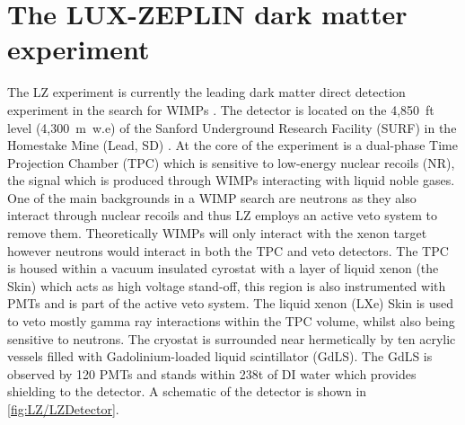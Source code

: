 \chapter{The LUX-ZEPLIN dark matter experiment}\label{chap:LZExperiment}
The LZ experiment is currently the leading dark matter direct detection experiment in the search for WIMPs \cite{LZ:2024zvo}. The detector is located on the 4,850~ft level (4,300~m~w.e) of the Sanford Underground Research Facility (SURF) in the Homestake Mine (Lead, SD) \cite{LZNIMA}. At the core of the experiment is a dual-phase Time Projection Chamber (TPC) which is sensitive to low-energy nuclear recoils (NR), the signal which is produced through WIMPs interacting with liquid noble gases. One of the main backgrounds in a WIMP search are neutrons as they also interact through nuclear recoils and thus LZ employs an active veto system to remove them. Theoretically WIMPs will only interact with the xenon target however neutrons would interact in both the TPC and veto detectors. The TPC is housed within a vacuum insulated cyrostat with a layer of liquid xenon (the Skin) which acts as high voltage stand-off, this region is also instrumented with PMTs and is part of the active veto system. The liquid xenon (LXe) Skin is used to veto mostly gamma ray interactions within the TPC volume, whilst also being sensitive to neutrons. The cryostat is surrounded near hermetically by ten acrylic vessels filled with Gadolinium-loaded liquid scintillator (GdLS). The GdLS is observed by 120 PMTs and stands within 238t of DI water which provides shielding to the detector. A schematic of the detector is shown in \autoref{fig:LZ/LZDetector}.
